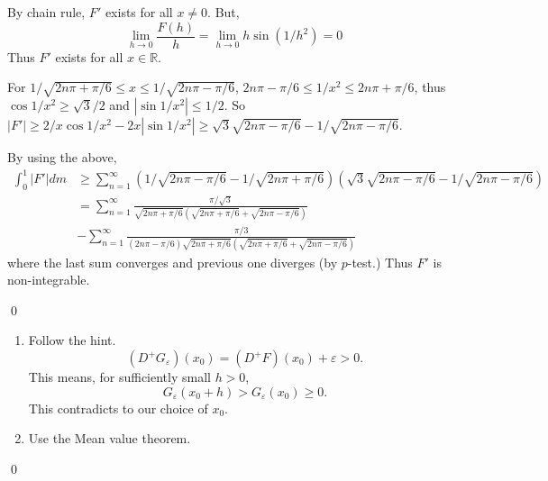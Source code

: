 \begin{exercise}[3.12] \hfill
	
	By chain rule, $F'$ exists for all $x \ne 0$.
	But, 
	\[
		\lim_{h \rightarrow 0} \frac{F(h)}{h} = \lim_{h\rightarrow 0} h\sin (1/h^2) = 0
	\]
	Thus $F'$ exists for all $x\in \mathbb{R}$.

	For $1/\sqrt{2n\pi + \pi/6} \leq x \leq 1/\sqrt{2n\pi - \pi/6}$, $2n\pi - \pi/6 \leq 1/x^2 \leq 2n\pi + \pi/6$, thus $\cos 1/x^2 \geq \sqrt{3}/2$ and $\left | \sin 1/x^2 \right | \leq 1/2$.
	So $|F'| \geq 2/x \cos 1/x^2 - 2x \left | \sin 1/x^2 \right | \geq \sqrt3 \sqrt{2n\pi -\pi/6} - 1/\sqrt{2n\pi - \pi/6}$.
	
	By using the above,
	\[
		\begin{split}
			\int_0^1 |F'| dm
			& \geq \sum_{n=1}^\infty \left( 1/\sqrt{2n\pi - \pi/6} - 1/\sqrt{2n\pi +\pi/6} \right)\left( \sqrt3 \sqrt{2n\pi - \pi/6} - 1/\sqrt{2n\pi - \pi/6} \right) \\
			& = \sum_{n=1}^\infty \frac{\pi / \sqrt 3}{\sqrt{2n\pi + \pi/6}\left( \sqrt{2n\pi + \pi/6} + \sqrt{2n\pi - \pi/6} \right)} \\
			& -\sum_{n=1}^\infty \frac{\pi/3}{\left( 2n\pi - \pi/6 \right)\sqrt{2n\pi+\pi/6} \left( \sqrt{2n\pi + \pi/6} + \sqrt{2n\pi - \pi/6} \right)}
		\end{split}
	\]
	where the last sum converges and previous one diverges (by $p$-test.)
	Thus $F'$ is non-integrable.

	\qed
\end{exercise}

\begin{exercise}[3.23] \hfill
	\begin{enumerate}[label = (\alph*)]
		\item Follow the hint.
			\[
				(D^+ G_\varepsilon)(x_0) = (D^+ F)(x_0) + \varepsilon > 0.
			\]
			This means, for sufficiently small $h>0$,
			\[
				G_\varepsilon(x_0 + h) > G_\varepsilon(x_0) \ge 0.
			\]
			This contradicts to our choice of $x_0$.

		\item Use the Mean value theorem.
	\end{enumerate}
	\qed
\end{exercise}

